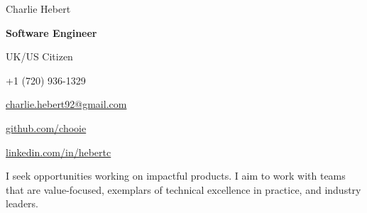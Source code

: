 \begin{center}
  {\Huge Charlie Hebert}

  \textbf{Software Engineer}

  UK/US Citizen
\end{center}

\noindent
\begin{minipage}[t]{0.5\textwidth}
  \begin{description}
    \raggedright
    \item[Mobile] +1 (720) 936-1329
    \item[Email]
      \href{mailto:charlie.hebert92@gmail.com}{charlie.hebert92@gmail.com}
  \end{description}
\end{minipage}
\noindent
\noindent
\begin{minipage}[t]{0.5\textwidth}
  \begin{description}
    \raggedleft
    \item[Github] \href{http://www.github.com/chooie}{github.com/chooie}
    \item[LinkedIn]
      \href{http://linkedin.com/in/hebertc}{linkedin.com/in/hebertc}
  \end{description}
\end{minipage}
\noindent

\begin{center}
  I seek opportunities working on impactful products. I aim to work with teams
  that are value-focused, exemplars of technical excellence in practice, and
  industry leaders.
\end{center}

